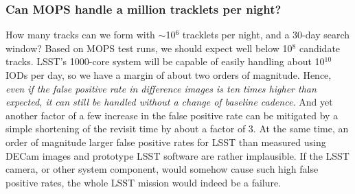 \subsubsection{Can MOPS handle a million tracklets per night?} 

How many tracks can we form with $\sim$10$^6$ tracklets per night, and a 30-day search window? 
Based on MOPS test runs, we should expect well below 10$^8$ candidate tracks. LSST's 1000-core
system will be capable of easily handling about 10$^{10}$ IODs per day, so we have a margin
of about two orders of magnitude. Hence, {\it even if the false positive rate in difference images is 
ten times higher than expected, it can still be handled without a change of baseline cadence.}
And yet another factor of a few increase in the false positive rate can be mitigated by a simple
shortening of the revisit time by about a factor of 3. At the same time, an order of magnitude 
larger false positive rates for LSST than measured using DECam images and prototype LSST software
are rather implausible. If the LSST camera, or other system component, would somehow
cause such high false positive rates, the whole LSST mission would indeed be a failure. 

